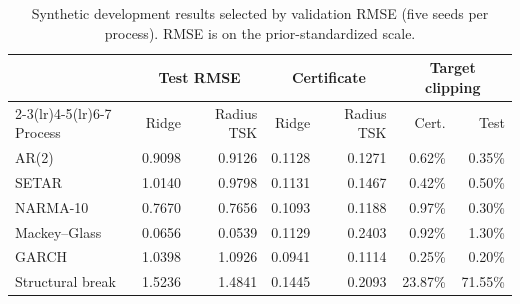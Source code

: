 \begin{table}[htbp]
\centering
\caption{Synthetic development results selected by validation RMSE (five seeds per process). RMSE is on the prior-standardized scale.}
\label{tab:process_results}
\small
\setlength{\tabcolsep}{5pt}
\begin{tabular}{lrrrrrr}
\toprule
& \multicolumn{2}{c}{Test RMSE} & \multicolumn{2}{c}{Certificate} & \multicolumn{2}{c}{Target clipping} \\
\cmidrule(lr){2-3}\cmidrule(lr){4-5}\cmidrule(lr){6-7}
Process & Ridge & Radius TSK & Ridge & Radius TSK & Cert. & Test \\
\midrule
AR(2) & 0.9098 & 0.9126 & 0.1128 & 0.1271 & 0.62\% & 0.35\% \\
SETAR & 1.0140 & 0.9798 & 0.1131 & 0.1467 & 0.42\% & 0.50\% \\
NARMA-10 & 0.7670 & 0.7656 & 0.1093 & 0.1188 & 0.97\% & 0.30\% \\
Mackey--Glass & 0.0656 & 0.0539 & 0.1129 & 0.2403 & 0.92\% & 1.30\% \\
GARCH & 1.0398 & 1.0926 & 0.0941 & 0.1114 & 0.25\% & 0.20\% \\
Structural break & 1.5236 & 1.4841 & 0.1445 & 0.2093 & 23.87\% & 71.55\% \\
\bottomrule
\end{tabular}
\end{table}
